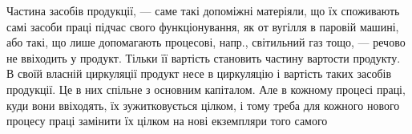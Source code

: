 \vtyagnut{}
Частина засобів продукції, — саме такі допоміжні матеріяли, що їх
споживають самі засоби праці підчас свого функціонування, як от вугілля
в паровій машині, або такі, що лише допомагають процесові,
напр., світильний газ тощо, — речово не ввіходить у продукт. Тільки її
вартість становить частину вартости продукту. В своїй власній циркуляції
продукт несе в циркуляцію і вартість таких засобів продукції. Це в
них спільне з основним капіталом. Але в кожному процесі праці, куди
вони ввіходять, їх зужитковується цілком, і тому треба для кожного нового
процесу праці замінити їх цілком на нові екземпляри того самого
\parbreak{}  %

